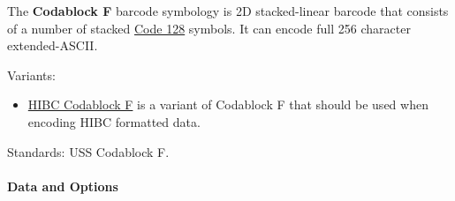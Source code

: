 The \textbf{Codablock F} barcode symbology is 2D stacked-linear barcode
that consists of a number of stacked \protect\hyperlink{code-128}{Code
128} symbols. It can encode full 256 character extended-ASCII.

Variants:

\begin{itemize}
\tightlist
\item
  \protect\hyperlink{hibc-symbols}{HIBC Codablock F} is a variant of
  Codablock F that should be used when encoding HIBC formatted data.
\end{itemize}

Standards: USS Codablock F.

\hypertarget{data-and-options-62}{%
\paragraph{Data and Options}\label{data-and-options-62}}


